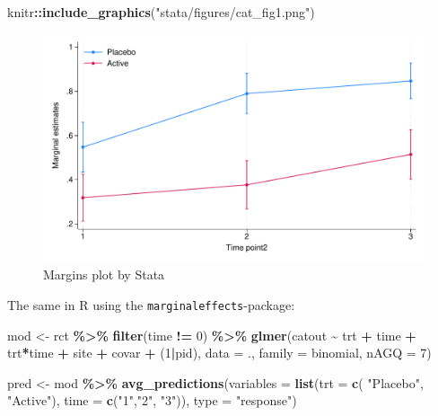 \documentclass[
]{book}
\newenvironment{Shaded}{\begin{snugshade}}{\end{snugshade}}
\newcommand{\AttributeTok}[1]{\textcolor[rgb]{0.13,0.29,0.53}{#1}}
\newcommand{\DecValTok}[1]{\textcolor[rgb]{0.00,0.00,0.81}{#1}}
\newcommand{\FunctionTok}[1]{\textcolor[rgb]{0.13,0.29,0.53}{\textbf{#1}}}
\newcommand{\NormalTok}[1]{#1}
\newcommand{\OtherTok}[1]{\textcolor[rgb]{0.56,0.35,0.01}{#1}}
\newcommand{\SpecialCharTok}[1]{\textcolor[rgb]{0.81,0.36,0.00}{\textbf{#1}}}
\newcommand{\StringTok}[1]{\textcolor[rgb]{0.31,0.60,0.02}{#1}}
\begin{document}
\begin{Shaded}
\begin{Highlighting}[]
\NormalTok{knitr}\SpecialCharTok{::}\FunctionTok{include\_graphics}\NormalTok{(}\StringTok{"stata/figures/cat\_fig1.png"}\NormalTok{)}
\end{Highlighting}
\end{Shaded}

\begin{figure}
\includegraphics[width=0.85\linewidth]{stata/figures/cat_fig1} \caption{Margins plot by Stata}\label{fig:unnamed-chunk-1}
\end{figure}

The same in R using the \texttt{marginaleffects}-package:

\begin{Shaded}
\begin{Highlighting}[]
\NormalTok{mod }\OtherTok{\textless{}{-}}\NormalTok{ rct }\SpecialCharTok{\%\textgreater{}\%}
  \FunctionTok{filter}\NormalTok{(time }\SpecialCharTok{!=} \DecValTok{0}\NormalTok{) }\SpecialCharTok{\%\textgreater{}\%}
  \FunctionTok{glmer}\NormalTok{(catout }\SpecialCharTok{\textasciitilde{}}\NormalTok{ trt }\SpecialCharTok{+}\NormalTok{ time }\SpecialCharTok{+}\NormalTok{ trt}\SpecialCharTok{*}\NormalTok{time }\SpecialCharTok{+}\NormalTok{ site }\SpecialCharTok{+}\NormalTok{ covar }\SpecialCharTok{+}\NormalTok{ (}\DecValTok{1}\SpecialCharTok{|}\NormalTok{pid), }
        \AttributeTok{data =}\NormalTok{ ., }
        \AttributeTok{family =}\NormalTok{ binomial, }
        \AttributeTok{nAGQ =} \DecValTok{7}\NormalTok{)}

\NormalTok{pred }\OtherTok{\textless{}{-}}\NormalTok{ mod }\SpecialCharTok{\%\textgreater{}\%} 
  \FunctionTok{avg\_predictions}\NormalTok{(}\AttributeTok{variables =} \FunctionTok{list}\NormalTok{(}\AttributeTok{trt =} \FunctionTok{c}\NormalTok{( }\StringTok{"Placebo"}\NormalTok{, }\StringTok{"Active"}\NormalTok{), }\AttributeTok{time =} \FunctionTok{c}\NormalTok{(}\StringTok{"1"}\NormalTok{,}\StringTok{"2"}\NormalTok{, }\StringTok{"3"}\NormalTok{)), }\AttributeTok{type =} \StringTok{"response"}\NormalTok{) }
\end{Highlighting}
\end{Shaded}
\end{document}
